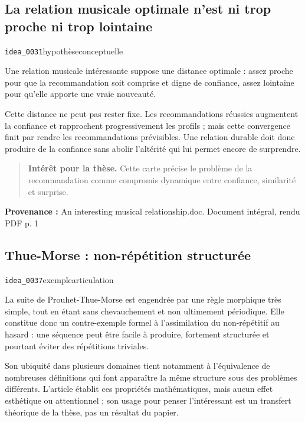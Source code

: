 \documentclass[10pt,a4paper]{article}
\begin{document}
\subsection{La relation musicale optimale n'est ni trop proche ni trop lointaine}
{\small\color{metadata} \texttt{idea\_0031}\quad\textbullet\quad hypothèse\quad\textbullet\quad conceptuelle\par}

Une relation musicale intéressante suppose une distance optimale : assez proche pour que la recommandation soit comprise et digne de confiance, assez lointaine pour qu'elle apporte une vraie nouveauté.

Cette distance ne peut pas rester fixe. Les recommandations réussies augmentent la confiance et rapprochent progressivement les profils ; mais cette convergence finit par rendre les recommandations prévisibles. Une relation durable doit donc produire de la confiance sans abolir l'altérité qui lui permet encore de surprendre.

\begin{quote}
\textbf{Intérêt pour la thèse.} Cette carte précise le problème de la recommandation comme compromis dynamique entre confiance, similarité et surprise.
\end{quote}
{\footnotesize\color{metadata}\textbf{Provenance :} An interesting musical relationship.doc. Document intégral, rendu PDF p. 1\par}

\subsection{Thue-Morse : non-répétition structurée}
{\small\color{metadata} \texttt{idea\_0037}\quad\textbullet\quad exemple\quad\textbullet\quad articulation\par}

La suite de Prouhet-Thue-Morse est engendrée par une règle morphique très simple, tout en étant sans chevauchement et non ultimement périodique. Elle constitue donc un contre-exemple formel à l'assimilation du non-répétitif au hasard : une séquence peut être facile à produire, fortement structurée et pourtant éviter des répétitions triviales.

Son ubiquité dans plusieurs domaines tient notamment à l'équivalence de nombreuses définitions qui font apparaître la même structure sous des problèmes différents. L'article établit ces propriétés mathématiques, mais aucun effet esthétique ou attentionnel ; son usage pour penser l'intéressant est un transfert théorique de la thèse, pas un résultat du papier.
\end{document}

